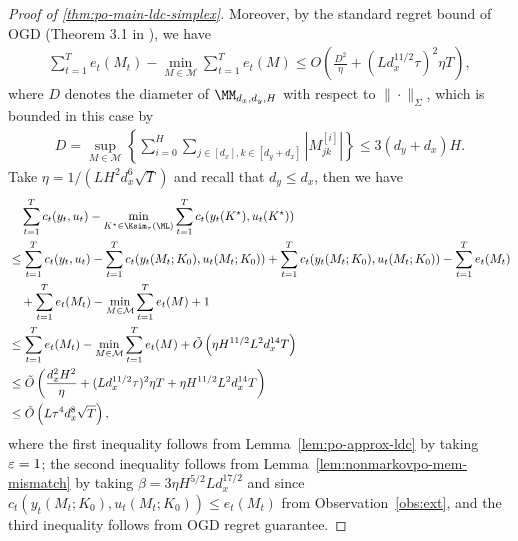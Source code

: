 \begin{proof} [Proof of \cref{thm:po-main-ldc-simplex}]
Moreover, by the standard regret bound of OGD (Theorem 3.1 in \cite{hazan2016introduction}), we have
\begin{align*}
\sum_{t=1}^T e_t(M_t)-\min_{M\in\mathcal{M}}\sum_{t=1}^T e_t(M)\le O\left(\frac{D^2}{\eta}+(Ld_x^{11/2}\tau)^2\eta T\right), 
\end{align*}
where $D$ denotes the diameter of $\MM_{d_x,d_y,H}$ with respect to $\|\cdot\|_{\Sigma}$, which is bounded in this case by 
\begin{align*}
D=\sup_{M\in\mathcal{M}}\left\{ \sum_{i=0}^H\sum_{j\in[d_x],k\in[d_y+d_x]}|M^{[i]}_{jk}|\right\}\le 3(d_y+d_x)H.
\end{align*}
Take $\eta=1/(LH^{2}d_x^{6}\sqrt{T})$ and recall that $d_y\le d_x$, then we have
\begin{align*}
& \quad \sum_{t=1}^T c_t(y_t,u_t)-\min_{K^{\star}\in \Ksim_\tau(\ML)}\sum_{t=1}^T c_t(y_t(K^{\star}),u_t(K^{\star}))\\
&\le \sum_{t=1}^T c_t(y_t,u_t)-\sum_{t=1}^T c_t(y_t(M_t;K_0),u_t(M_t;K_0))+\sum_{t=1}^T c_t(y_t(M_t;K_0),u_t(M_t;K_0))- \sum_{t=1}^Te_t(M_t)\\
& \quad + \sum_{t=1}^Te_t(M_t)-\min_{M\in\mathcal{M}}\sum_{t=1}^T e_t(M)+1\\
&\le \sum_{t=1}^T e_t(M_t)-\min_{M\in\mathcal{M}}\sum_{t=1}^T e_t(M)+\tilde{O}\left(\eta H^{11/2}L^2d_x^{14} T\right)\\
&\le \tilde{O}\left(\frac{d_x^2H^2}{\eta}+(Ld_x^{11/2}\tau)^2\eta T+\eta H^{11/2}L^2d_x^{14} T\right)\\
&\le \tilde{O}\left(L\tau^{4}d_x^{8}\sqrt{T}\right),
\end{align*}
where the first inequality follows from Lemma~\ref{lem:po-approx-ldc} by taking $\varepsilon=1$; the second inequality follows from Lemma~\ref{lem:nonmarkovpo-mem-mismatch} by taking $\beta=3\eta H^{5/2}Ld_x^{17/2}$ and since $c_t(y_t(M_t;K_0),u_t(M_t;K_0))\le e_t(M_t)$ from Observation~\ref{obs:ext}, and the third inequality follows from OGD regret guarantee. 
\end{proof}

